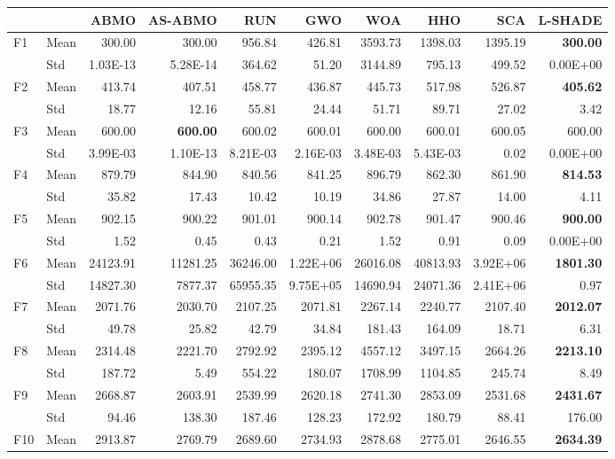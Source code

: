 \begin{tabular}{@{}llrrrrrrrr@{}}
\toprule
 & & ABMO & AS-ABMO & RUN & GWO & WOA & HHO & SCA & L-SHADE \\
\midrule
F1 & Mean & 300.00 & 300.00 & 956.84 & 426.81 & 3593.73 & 1398.03 & 1395.19 & \textbf{300.00} \\
 & Std & 1.03E-13 & 5.28E-14 & 364.62 & 51.20 & 3144.89 & 795.13 & 499.52 & 0.00E+00 \\
F2 & Mean & 413.74 & 407.51 & 458.77 & 436.87 & 445.73 & 517.98 & 526.87 & \textbf{405.62} \\
 & Std & 18.77 & 12.16 & 55.81 & 24.44 & 51.71 & 89.71 & 27.02 & 3.42 \\
F3 & Mean & 600.00 & \textbf{600.00} & 600.02 & 600.01 & 600.00 & 600.01 & 600.05 & 600.00 \\
 & Std & 3.99E-03 & 1.10E-13 & 8.21E-03 & 2.16E-03 & 3.48E-03 & 5.43E-03 & 0.02 & 0.00E+00 \\
F4 & Mean & 879.79 & 844.90 & 840.56 & 841.25 & 896.79 & 862.30 & 861.90 & \textbf{814.53} \\
 & Std & 35.82 & 17.43 & 10.42 & 10.19 & 34.86 & 27.87 & 14.00 & 4.11 \\
F5 & Mean & 902.15 & 900.22 & 901.01 & 900.14 & 902.78 & 901.47 & 900.46 & \textbf{900.00} \\
 & Std & 1.52 & 0.45 & 0.43 & 0.21 & 1.52 & 0.91 & 0.09 & 0.00E+00 \\
F6 & Mean & 24123.91 & 11281.25 & 36246.00 & 1.22E+06 & 26016.08 & 40813.93 & 3.92E+06 & \textbf{1801.30} \\
 & Std & 14827.30 & 7877.37 & 65955.35 & 9.75E+05 & 14690.94 & 24071.36 & 2.41E+06 & 0.97 \\
F7 & Mean & 2071.76 & 2030.70 & 2107.25 & 2071.81 & 2267.14 & 2240.77 & 2107.40 & \textbf{2012.07} \\
 & Std & 49.78 & 25.82 & 42.79 & 34.84 & 181.43 & 164.09 & 18.71 & 6.31 \\
F8 & Mean & 2314.48 & 2221.70 & 2792.92 & 2395.12 & 4557.12 & 3497.15 & 2664.26 & \textbf{2213.10} \\
 & Std & 187.72 & 5.49 & 554.22 & 180.07 & 1708.99 & 1104.85 & 245.74 & 8.49 \\
F9 & Mean & 2668.87 & 2603.91 & 2539.99 & 2620.18 & 2741.30 & 2853.09 & 2531.68 & \textbf{2431.67} \\
 & Std & 94.46 & 138.30 & 187.46 & 128.23 & 172.92 & 180.79 & 88.41 & 176.00 \\
F10 & Mean & 2913.87 & 2769.79 & 2689.60 & 2734.93 & 2878.68 & 2775.01 & 2646.55 & \textbf{2634.39} \\

\end{tabular}

